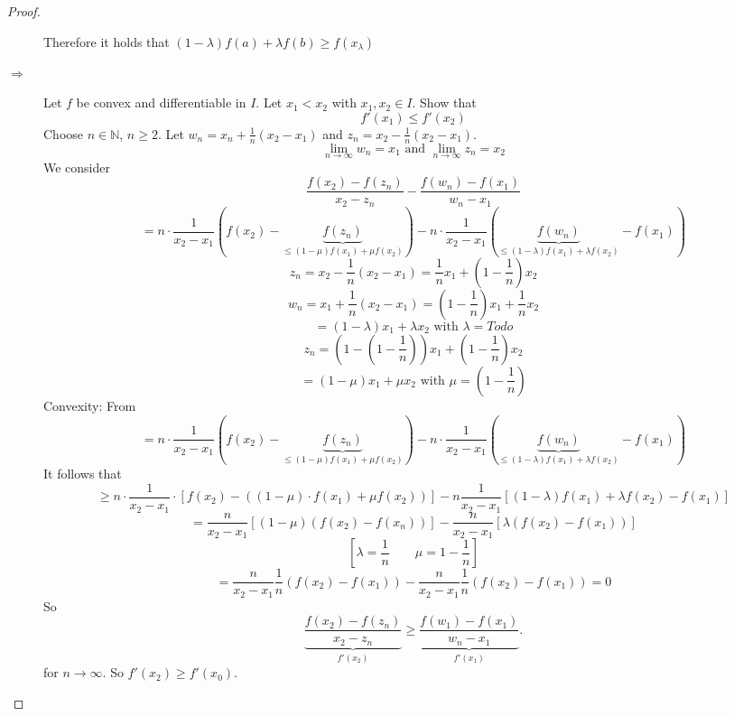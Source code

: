 \documentclass[a4paper,landscape,twocolumn]{article}
\theoremstyle{definition}
\begin{document}
\begin{proof}
\begin{description}
      Therefore it holds that $(1 - \lambda) f(a) + \lambda f(b) \geq f(x_\lambda)$
    \item[$\Rightarrow$]
      Let $f$ be convex and differentiable in $I$. Let $x_1 < x_2$ with $x_1, x_2 \in I$.
      Show that
      \[ f'(x_1) \leq f'(x_2) \]
      Choose $n \in \mathbb N$, $n \geq 2$. Let $w_n = x_n + \frac1n (x_2 - x_1)$ and
      $z_n = x_2 - \frac 1n (x_2 - x_1)$.
      \[ \lim_{n\to\infty} w_n = x_1 \text{ and } \lim_{n\to\infty} z_n = x_2 \]
      We consider
      \[ \frac{f(x_2) - f(z_n)}{x_2 - z_n} - \frac{f(w_n) - f(x_1)}{w_n - x_1} \]
      \[
        = n \cdot \frac{1}{x_2 - x_1} \left( f(x_2) - \underbrace{f(z_n)}_{\leq (1 - \mu) f(x_1) + \mu f(x_2)} \right)
        - n \cdot \frac{1}{x_2 - x_1} \left( \underbrace{f(w_n)}_{\leq (1 - \lambda) f(x_1) + \lambda f(x_2)} - f(x_1) \right)
      \] \[
        z_n = x_2 - \frac 1n (x_2 - x_1) = \frac 1n x_1 + (1 - \frac1n) x_2
      \] \[
        w_n = x_1 + \frac 1n (x_2 - x_1) = \left(1 - \frac1n\right) x_1 + \frac 1n x_2
      \] \[
        = (1 - \lambda) x_1 + \lambda x_2 \text{ with } \lambda = Todo
      \] \[
        z_n = \left(1 - (1 - \frac1n)\right) x_1 + \left(1 - \frac1n\right) x_2
      \] \[
        = (1 - \mu) x_1 + \mu x_2 \text{ with } \mu = (1 - \frac 1n)
      \]
      Convexity: From
      \[
        = n \cdot \frac{1}{x_2 - x_1} \left( f(x_2) - \underbrace{f(z_n)}_{\leq (1 - \mu) f(x_1) + \mu f(x_2)} \right)
        - n \cdot \frac{1}{x_2 - x_1} \left( \underbrace{f(w_n)}_{\leq (1 - \lambda) f(x_1) + \lambda f(x_2)} - f(x_1) \right)
      \]
      It follows that
      \[
        \geq n \cdot \frac{1}{x_2 - x_1} \cdot \left[ f(x_2) - \left((1 - \mu) \cdot f(x_1) + \mu f(x_2)\right)\right]
        - n \frac{1}{x_2 - x_1} \left[(1 - \lambda) f(x_1) + \lambda f(x_2) - f(x_1)\right]
      \] \[
        = \frac{n}{x_2 - x_1} \left[(1 - \mu) (f(x_2) - f(x_n))\right]
        - \frac{n}{x_2 - x_1} \left[\lambda (f(x_2) - f(x_1))\right]
      \] \[
        \left[ \lambda = \frac1n \qquad \mu = 1 - \frac1n \right]
      \] \[
        = \frac{n}{x_2 - x_1} \frac1n \left(f(x_2) - f(x_1)\right)
        - \frac{n}{x_2 - x_1} \frac1n (f(x_2) - f(x_1)) = 0
      \]
      So
      \[ \underbrace{\frac{f(x_2) - f(z_n)}{x_2 - z_n}}_{f'(x_2)} \geq \underbrace{\frac{f(w_1) - f(x_1)}{w_n - x_1}}_{f'(x_1)}. \]
      for $n \to \infty$. So $f'(x_2) \geq f'(x_0)$.
  \end{description}
\end{proof}
%
\end{document}
